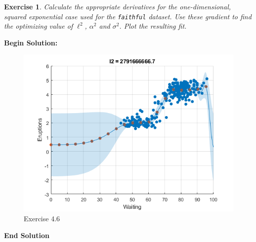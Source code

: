 \documentclass[twoside]{article}
\newcounter{lecnum}
\newtheorem{exercise}{Exercise}[lecnum]
\begin{document}
 \begin{exercise}
   Calculate the appropriate derivatives for the one-dimensional, squared exponential case used for the \texttt{faithful} dataset. Use these gradient to find the optimizing value of $\ell^2$, $\alpha^2$ and $\sigma^2$. Plot the resulting fit.
 \end{exercise}

\textbf{Begin Solution:}
\begin{figure}[H]
\begin{center}
\includegraphics[width=\textwidth]{./Exercise46/exercise46.png}
\end{center}
\caption{Exercise 4.6}
\end{figure} 
\textbf{End Solution}
\end{document}
